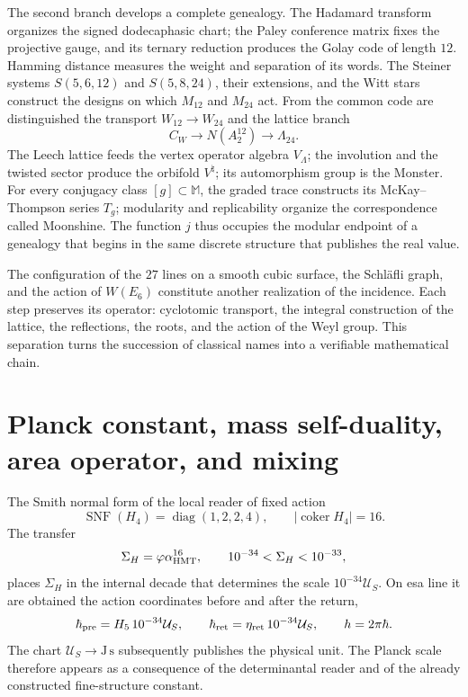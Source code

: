 The second branch develops a complete genealogy. The Hadamard transform
organizes the signed dodecaphasic chart; the Paley conference matrix
fixes the projective gauge, and its ternary reduction produces the Golay
code of length \(12\). Hamming distance measures the weight and
separation of its words. The Steiner systems
\(S(5,6,12)\) and \(S(5,8,24)\), their extensions, and the Witt stars
construct the designs on which \(M_{12}\) and \(M_{24}\) act. From
the common code are distinguished the transport \(W_{12}\to W_{24}\) and the
lattice branch
\[
 C_W\longrightarrow N(A_2^{12})\longrightarrow\Lambda_{24}.
\]
The Leech lattice feeds the vertex operator algebra \(V_\Lambda\); the involution and the twisted sector produce the orbifold \(V^\natural\); its automorphism group is the Monster. For every conjugacy class \([g]\subset\mathbb M\), the graded trace constructs its McKay--Thompson series \(T_g\); modularity and replicability organize the correspondence called Moonshine. The function \(j\) thus occupies the modular endpoint of a genealogy that begins in the same discrete structure that publishes the real value.

The configuration of the \(27\) lines on a smooth cubic surface,
the Schläfli graph, and the action of \(W(E_6)\) constitute another realization
of the incidence. Each step preserves its operator: cyclotomic transport,
the integral construction of the lattice, the reflections, the roots, and the
action of the Weyl group. This separation turns the succession of classical names
into a verifiable mathematical chain.

\section*{Planck constant, mass self-duality, area operator, and mixing}

The Smith normal form of the local reader of fixed action
\[
 \operatorname{SNF}(H_4)=\operatorname{diag}(1,2,2,4),
 \qquad |\operatorname{coker}H_4|=16.
\]
The transfer
\[
 \Sigma_H=\varphi\alpha_{\rm HMT}^{16},
 \qquad 10^{-34}<\Sigma_H<10^{-33},
\]
places \(\Sigma_H\) in the internal decade that determines the scale
\(10^{-34}\mathcal U_S\). On esa line it are obtained the
action coordinates before and after the return,
\[
 \hbar_{\rm pre}=H_5\,10^{-34}\mathcal U_S,
 \qquad
 \hbar_{\rm ret}=\eta_{\rm ret}\,10^{-34}\mathcal U_S,
 \qquad h=2\pi\hbar.
\]
The chart \(\mathcal U_S\to\mathrm{J\,s}\) subsequently publishes the physical unit.
The Planck scale therefore appears as a consequence of the determinantal
reader and of the already constructed fine-structure constant.

